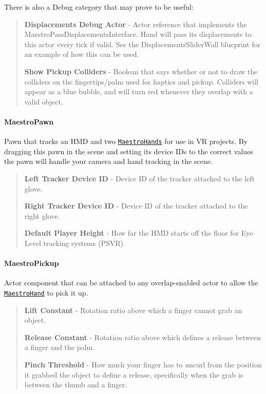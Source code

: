 There is also a Debug category that may prove to be useful\+: \begin{quote}
{\bfseries Displacements Debug Actor} -\/ Actor reference that implements the {\ttfamily Maestro\+Pass\+Displacements\+Interface}. Hand will pass its displacements to this actor every tick if valid. See the {\ttfamily Displacements\+Slider\+Wall} blueprint for an example of how this can be used.

{\bfseries Show Pickup Colliders} -\/ Boolean that says whether or not to draw the colliders on the fingertips/palm used for haptics and pickup. Colliders will appear as a blue bubble, and will turn red whenever they overlap with a valid object. \end{quote}


\paragraph*{Maestro\+Pawn}

Pawn that tracks an H\+MD and two \href{#maestrohand}{\tt Maestro\+Hands} for use in VR projects. By dragging this pawn in the scene and setting its device I\+Ds to the correct values the pawn will handle your camera and hand tracking in the scene. \begin{quote}
{\bfseries Left Tracker Device ID} -\/ Device ID of the tracker attached to the left glove.

{\bfseries Right Tracker Device ID} -\/ Device ID of the tracker attached to the right glove.

{\bfseries Default Player Height} -\/ How far the H\+MD starts off the floor for Eye Level tracking systems (P\+S\+VR). \end{quote}


\paragraph*{Maestro\+Pickup}

Actor component that can be attached to any overlap-\/enabled actor to allow the \href{#maestrohand}{\tt Maestro\+Hand} to pick it up. \begin{quote}
{\bfseries Lift Constant} -\/ Rotation ratio above which a finger cannot grab an object.

{\bfseries Release Constant} -\/ Rotation ratio above which defines a release between a finger and the palm.

{\bfseries Pinch Threshold} -\/ How much your finger has to uncurl from the position it grabbed the object to define a release, specifically when the grab is between the thumb and a finger. \end{quote}


